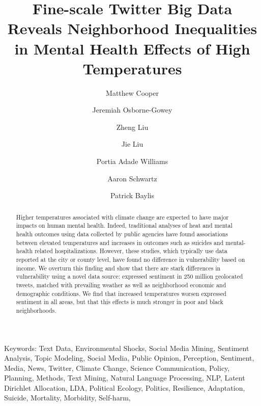 \documentclass{article}
\begin{document}
\title{Fine-scale Twitter Big Data Reveals Neighborhood Inequalities in Mental Health Effects of High Temperatures}

\author[1, *]{Matthew Cooper}
\author[2]{Jeremiah Osborne-Gowey}
\author[3]{Zheng Liu}
\author[4]{Jie Liu}
\author[5]{Portia Adade Williams}
\author[6]{Aaron Schwartz}
\author[7]{Patrick Baylis}


\maketitle

\begin{abstract}
Higher temperatures associated with climate change are expected to have major impacts on human mental health.  Indeed, traditional analyses of heat and mental health outcomes using data collected by public agencies have found associations between elevated temperatures and increases in outcomes such as suicides and mental-health related hospitalizations.  However, these studies, which typically use data reported at the city or county level, have found no difference in vulnerability based on income.  We overturn this finding and show that there are stark differences in vulnerability using a novel data source: expressed sentiment in 250 million geolocated tweets, matched with prevailing weather as well as neighborhood economic and demographic conditions.  We find that increased temperatures worsen expressed sentiment in all areas, but that this effects is much stronger in poor and black neighborhoods.

\end{abstract}

Keywords: Text Data, Environmental Shocks, Social Media Mining, Sentiment Analysis, Topic Modeling, Social Media, Public Opinion, Perception, Sentiment, Media, News, Twitter, Climate Change, Science Communication, Policy, Planning, Methods, Text Mining, Natural Language Processing, NLP, Latent Dirichlet Allocation, LDA, Political Ecology, Politics, Resilience, Adaptation, Suicide, Mortality, Morbidity, Self-harm, 
\end{document}
